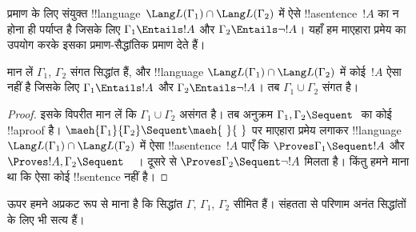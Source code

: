 \documentclass[../../../include/open-logic-section]{subfiles}
\begin{document}
प्रमाण के लिए संयुक्त !!{language}~$\Lang L(\Gamma_1) \cap \Lang L(\Gamma_2)$
में ऐसे !!a{sentence}~$!A$ का न होना ही पर्याप्त है जिसके लिए $\Gamma_1
\Entails !A$ और $\Gamma_2 \Entails \lnot !A$। यहाँ हम माएहारा प्रमेय का
उपयोग करके इसका प्रमाण-सैद्धांतिक प्रमाण देते हैं।

\begin{thm}[रॉबिन्सन संयुक्त संगति प्रमेय]
मान लें $\Gamma_1$, $\Gamma_2$ संगत सिद्धांत हैं, और !!{language} $\Lang
L(\Gamma_1) \cap \Lang L(\Gamma_2)$ में कोई~$!A$ ऐसा नहीं है जिसके लिए
$\Gamma_1 \Entails !A$ और $\Gamma_2 \Entails \lnot !A$। तब $\Gamma_1 \cup
\Gamma_2$ संगत है।
\end{thm}

\begin{proof}
  इसके विपरीत मान लें कि $\Gamma_1 \cup \Gamma_2$ असंगत है। तब अनुक्रम
  $\Gamma_1, \Gamma_2 \Sequent \ $ का कोई !!a{proof} है।
  $\maeh{\Gamma_1}{\Gamma_2} \Sequent \maeh{\ }{\ }$ पर माएहारा प्रमेय लगाकर
  !!{language}~$\Lang L(\Gamma_1) \cap \Lang L(\Gamma_2)$ में ऐसा
  !!a{sentence}~$!A$ पाएँ कि $\Proves \Gamma_1 \Sequent !A$ और $\Proves !A,
  \Gamma_2 \Sequent \quad$। दूसरे से $\Proves \Gamma_2 \Sequent \lnot !A$
  मिलता है। किंतु हमने माना था कि ऐसा कोई !!{sentence} नहीं है।
\end{proof}

ऊपर हमने अप्रकट रूप से माना है कि सिद्धांत $\Gamma$, $\Gamma_1$, $\Gamma_2$
सीमित हैं। संहतता से परिणाम अनंत सिद्धांतों के लिए भी सत्य हैं।
\end{document}
